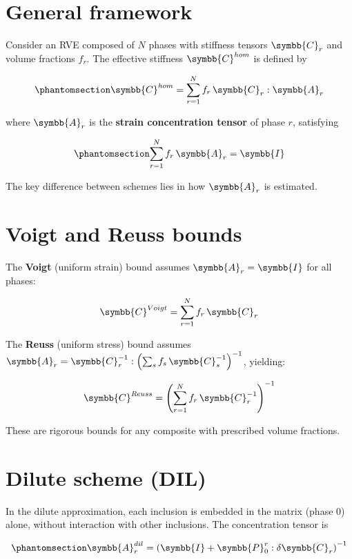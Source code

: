 \documentclass[
  a4paper,
  numbers=noendperiod,
  DIV=12]{scrreprt}
\newcommand{\uuuu}[1]{{\symbb{{#1}}}}
\begin{document}
\section{General framework}\label{general-framework}

Consider an RVE composed of \(N\) phases with stiffness tensors
\(\uuuu{C}_r\) and volume fractions \(f_r\). The effective stiffness
\(\uuuu{C}^{hom}\) is defined by

\begin{equation}\protect\phantomsection\label{eq-Chom-general}{
\uuuu{C}^{hom} = \sum_{r=1}^{N} f_r \, \uuuu{C}_r : \uuuu{A}_r
}\end{equation}

where \(\uuuu{A}_r\) is the \textbf{strain concentration tensor} of
phase \(r\), satisfying

\begin{equation}\protect\phantomsection\label{eq-A-constraint}{
\sum_{r=1}^{N} f_r \, \uuuu{A}_r = \uuuu{I}
}\end{equation}

The key difference between schemes lies in how \(\uuuu{A}_r\) is
estimated.

\section{Voigt and Reuss bounds}\label{sec-voigt-reuss-deriv}

The \textbf{Voigt} (uniform strain) bound assumes
\(\uuuu{A}_r = \uuuu{I}\) for all phases:

\[
\uuuu{C}^{Voigt} = \sum_{r=1}^{N} f_r \, \uuuu{C}_r
\]

The \textbf{Reuss} (uniform stress) bound assumes
\(\uuuu{A}_r = \uuuu{C}_r^{-1} : \left(\sum_s f_s \, \uuuu{C}_s^{-1}\right)^{-1}\),
yielding:

\[
\uuuu{C}^{Reuss} = \left(\sum_{r=1}^{N} f_r \, \uuuu{C}_r^{-1}\right)^{-1}
\]

These are rigorous bounds for any composite with prescribed volume
fractions.

\section{Dilute scheme (DIL)}\label{sec-dil-deriv}

In the dilute approximation, each inclusion is embedded in the matrix
(phase 0) alone, without interaction with other inclusions. The
concentration tensor is

\begin{equation}\protect\phantomsection\label{eq-A-dil}{
\uuuu{A}_r^{dil} = \left(\uuuu{I} + \uuuu{P}_0^r : \delta\uuuu{C}_r\right)^{-1}
}\end{equation}
\end{document}
